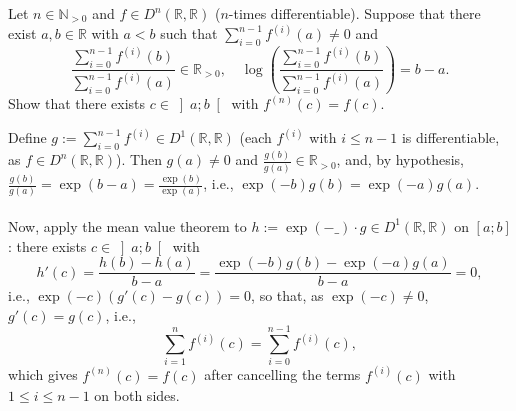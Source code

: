 \begin{problem}
    Let \( n \in \mathbb{N}_{>0} \) and \( f \in D^n\left(\mathbb{R},\mathbb{R}\right) \) (\( n \)-times differentiable). Suppose that there exist \( a, b \in \mathbb{R} \) with \( a < b \) such that \( \sum_{i=0}^{n-1} f^{\left(i\right)}\left(a\right) \neq 0 \) and
    \[
        \frac{\sum_{i=0}^{n-1} f^{\left(i\right)}\left(b\right)}{\sum_{i=0}^{n-1} f^{\left(i\right)}\left(a\right)} \in \mathbb{R}_{>0}, \quad \log\left(\frac{\sum_{i=0}^{n-1} f^{\left(i\right)}\left(b\right)}{\sum_{i=0}^{n-1} f^{\left(i\right)}\left(a\right)}\right) = b-a.
    \]
    Show that there exists \( c \in \left]a;b\right[ \) with \( f^{\left(n\right)}\left(c\right) = f\left(c\right) \).
\end{problem}
\begin{solution}
    Define \( g := \sum_{i=0}^{n-1} f^{\left(i\right)} \in D^1\left(\mathbb{R},\mathbb{R}\right) \) (each \( f^{\left(i\right)} \) with \( i \leq n-1 \) is differentiable, as \( f \in D^n\left(\mathbb{R},\mathbb{R}\right) \)). Then \( g\left(a\right) \neq 0 \) and \( \frac{g\left(b\right)}{g\left(a\right)} \in \mathbb{R}_{>0} \), and, by hypothesis, \( \frac{g\left(b\right)}{g\left(a\right)} = \exp\left(b-a\right) = \frac{\exp\left(b\right)}{\exp\left(a\right)} \), i.e., \( \exp\left(-b\right)g\left(b\right) = \exp\left(-a\right)g\left(a\right) \).
    \\\\
    Now, apply the mean value theorem to \( h := \exp\left(-\_\right) \cdot g \in D^1\left(\mathbb{R},\mathbb{R}\right) \) on \( \left[a;b\right] \): there exists \( c \in \left]a;b\right[ \) with
    \[
        h'\left(c\right) = \frac{h\left(b\right)-h\left(a\right)}{b-a} = \frac{\exp\left(-b\right)g\left(b\right)-\exp\left(-a\right)g\left(a\right)}{b-a} = 0,
    \]
    i.e., \( \exp\left(-c\right)\left(g'\left(c\right)-g\left(c\right)\right) = 0 \), so that, as \( \exp\left(-c\right) \neq 0 \), \( g'\left(c\right) = g\left(c\right) \), i.e.,
    \[
        \sum_{i=1}^{n} f^{\left(i\right)}\left(c\right) = \sum_{i=0}^{n-1} f^{\left(i\right)}\left(c\right),
    \]
    which gives \( f^{\left(n\right)}\left(c\right) = f\left(c\right) \) after cancelling the terms \( f^{\left(i\right)}\left(c\right) \) with \( 1 \leq i \leq n-1 \) on both sides.
\end{solution}
